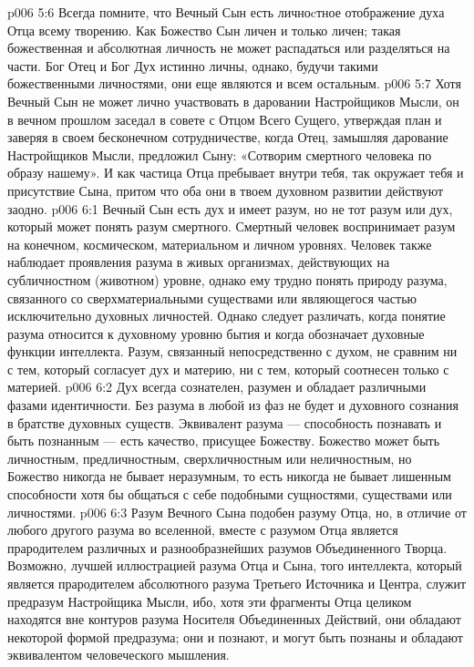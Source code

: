 \vs p006 5:6 Всегда помните, что Вечный Сын есть личноcтное отображение духа Отца всему творению. Как Божество Сын личен и только личен; такая божественная и абсолютная личность не может распадаться или разделяться на части. Бог Отец и Бог Дух истинно личны, однако, будучи такими божественными личностями, они еще являются и всем остальным.
\vs p006 5:7 Хотя Вечный Сын не может лично участвовать в даровании Настройщиков Мысли, он в вечном прошлом заседал в совете с Отцом Всего Сущего, утверждая план и заверяя в своем бесконечном сотрудничестве, когда Отец, замышляя дарование Настройщиков Мысли, предложил Сыну: «Сотворим смертного человека по образу нашему». И как частица Отца пребывает внутри тебя, так окружает тебя и присутствие Сына, притом что оба они в твоем духовном развитии действуют заодно.
\vs p006 6:1 Вечный Сын есть дух и имеет разум, но не тот разум или дух, который может понять разум смертного. Смертный человек воспринимает разум на конечном, космическом, материальном и личном уровнях. Человек также наблюдает проявления разума в живых организмах, действующих на субличностном (животном) уровне, однако ему трудно понять природу разума, связанного со сверхматериальными существами или являющегося частью исключительно духовных личностей. Однако следует различать, когда понятие разума относится к духовному уровню бытия и когда обозначает духовные функции интеллекта. Разум, связанный непосредственно с духом, не сравним ни с тем, который согласует дух и материю, ни с тем, который соотнесен только с материей.
\vs p006 6:2 Дух всегда сознателен, разумен и обладает различными фазами идентичности. Без разума в любой из фаз не будет и духовного сознания в братстве духовных существ. Эквивалент разума --- способность познавать и быть познанным --- есть качество, присущее Божеству. Божество может быть личностным, предличностным, сверхличностным или неличностным, но Божество никогда не бывает неразумным, то есть никогда не бывает лишенным способности хотя бы общаться с себе подобными сущностями, существами или личностями.
\vs p006 6:3 Разум Вечного Сына подобен разуму Отца, но, в отличие от любого другого разума во вселенной, вместе с разумом Отца является прародителем различных и разнообразнейших разумов Объединенного Творца. Возможно, лучшей иллюстрацией разума Отца и Сына, того интеллекта, который является прародителем абсолютного разума Третьего Источника и Центра, служит предразум Настройщика Мысли, ибо, хотя эти фрагменты Отца целиком находятся вне контуров разума Носителя Объединенных Действий, они обладают некоторой формой предразума; они и познают, и могут быть познаны и обладают эквивалентом человеческого мышления.
